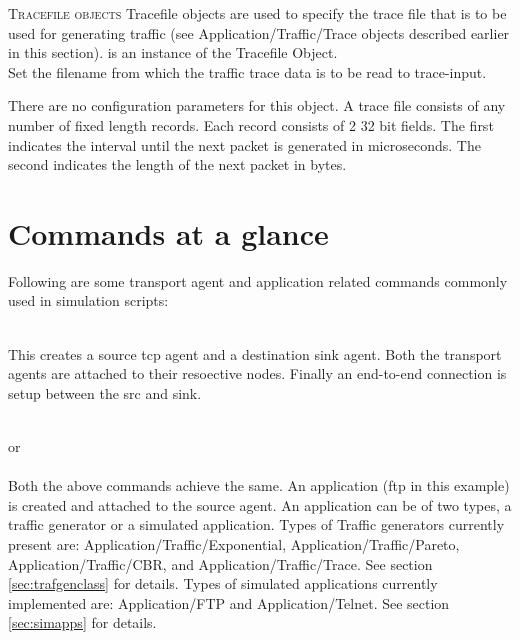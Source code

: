 \textsc{Tracefile objects}
Tracefile objects are used to specify the trace file that is to be used
for generating traffic (see Application/Traffic/Trace objects
described earlier in this section).  is an instance of
the Tracefile Object. 
\\
Set the filename from which the traffic trace data is to be read to
trace-input. 

There are no configuration parameters for this object. A trace file
consists of any number of fixed length records. Each record consists of 2
32 bit fields. The first indicates the interval until the next packet is
generated in microseconds. The second indicates the length of the next
packet in bytes. 



\section{Commands at a glance}
\label{sec:appscommand}

Following are some transport agent and application related commands
commonly used in simulation scripts:
\begin{flushleft}
\\
This creates a source tcp agent and a destination sink agent. Both the transport
agents are attached to their resoective nodes. Finally an end-to-end connection
is setup between the src and sink.


\\
or\\
\\
Both the above commands achieve the same. An application (ftp in this example)
is created and attached to the source agent. An application can be of two
types, a traffic generator or a simulated application.
Types of Traffic generators currently present are: 
Application/Traffic/Exponential, Application/Traffic/Pareto,
Application/Traffic/CBR, and Application/Traffic/Trace. See section \ref{sec:trafgenclass}
for details.
Types of simulated applications currently implemented are:
Application/FTP and Application/Telnet. See  section \ref{sec:simapps} for
details.

\end{flushleft}

\endinput
